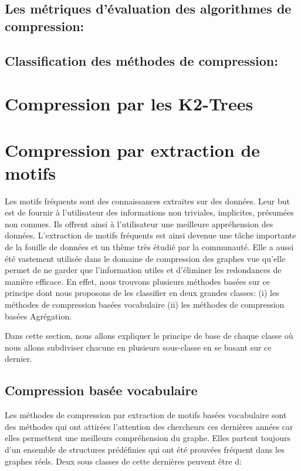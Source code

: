 \documentclass[a4paper,oneside,12pt]{report}
\theoremstyle{definition}
\begin{document}
	
			\subsection{Les métriques d'évaluation des algorithmes de compression:}
				
			
			\subsection{Classification des méthodes de compression:}
				
				
			\section{Compression par les K2-Trees}
				
				
			\section{Compression par extraction de motifs}
			 Les motifs fréquents sont des connaissances extraites sur des données. Leur but est de fournir à l'utilisateur des informations non triviales, implicites, présumées non connues. Ils offrent ainsi à l'utilisateur une meilleure appréhension des données. L'extraction de motifs fréquents est ainsi devenue une tâche importante de la fouille de données et un thème très étudié par la communauté. Elle a aussi été vastement%
			 utilisée dans le domaine de compression des graphes vue qu'elle permet de ne garder que l'information utiles et d'éliminer les redondances de manière efficace. En effet, nous trouvons plusieurs méthodes basées sur ce principe dont nous proposons de les classifier en deux grandes classes: 
			 (i) les méthodes  de compression basées vocabulaire
			 (ii) les méthodes  de compression basées Agrégation.
			 
				Dans cette section, nous allons expliquer le principe de base de chaque classe où nous allons subdiviser chacune  en plusieurs sous-classe en se basant sur ce dernier. 
			 
				\subsection{Compression basée vocabulaire}
				Les méthodes de compression par extraction de motifs basées vocabulaire sont des méthodes qui ont attirées l'attention des chercheurs ces dernières années car elles permettent une meilleurs compréhension du graphe. Elles partent toujours d'un ensemble de structures prédéfinies qui ont été prouvées fréquent dans les graphes réels. Deux sous classes de cette dernières peuvent être d:
				 
\end{document}
